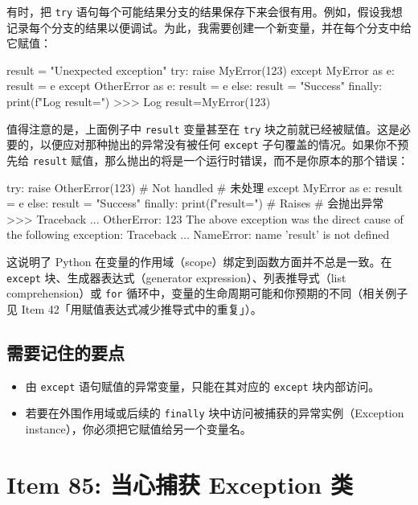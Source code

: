 有时，把 \texttt{try} 语句每个可能结果分支的结果保存下来会很有用。例如，假设我想记录每个分支的结果以便调试。为此，我需要创建一个新变量，并在每个分支中给它赋值：

\begin{codebox}[python]
result = "Unexpected exception"
try:
    raise MyError(123)
except MyError as e:
    result = e
except OtherError as e:
    result = e
else:
    result = "Success"
finally:
    print(f"Log {result=}")
>>>
Log result=MyError(123)
\end{codebox}

值得注意的是，上面例子中 \texttt{result} 变量甚至在 \texttt{try} 块之前就已经被赋值。这是必要的，以便应对那种抛出的异常没有被任何 \texttt{except} 子句覆盖的情况。如果你不预先给 \texttt{result} 赋值，那么抛出的将是一个运行时错误，而不是你原本的那个错误：

\begin{codebox}[python]
try:
    raise OtherError(123)  # Not handled
    # 未处理
except MyError as e:
    result = e
else:
    result = "Success"
finally:
    print(f"{result=}")    # Raises
    # 会抛出异常
>>>
Traceback ...
OtherError: 123
The above exception was the direct cause of the following
exception:
Traceback ...
NameError: name 'result' is not defined
\end{codebox}

这说明了 Python 在变量的作用域（scope）绑定到函数方面并不总是一致。在 \texttt{except} 块、生成器表达式（generator expression）、列表推导式（list comprehension）或 \texttt{for} 循环中，变量的生命周期可能和你预期的不同（相关例子见 Item 42「用赋值表达式减少推导式中的重复」）。

\subsection{需要记住的要点}

\begin{itemize}
\item 由 \texttt{except} 语句赋值的异常变量，只能在其对应的 \texttt{except} 块内部访问。
\item 若要在外围作用域或后续的 \texttt{finally} 块中访问被捕获的异常实例（Exception instance），你必须把它赋值给另一个变量名。
\end{itemize}

\section{Item 85: 当心捕获 Exception 类}

